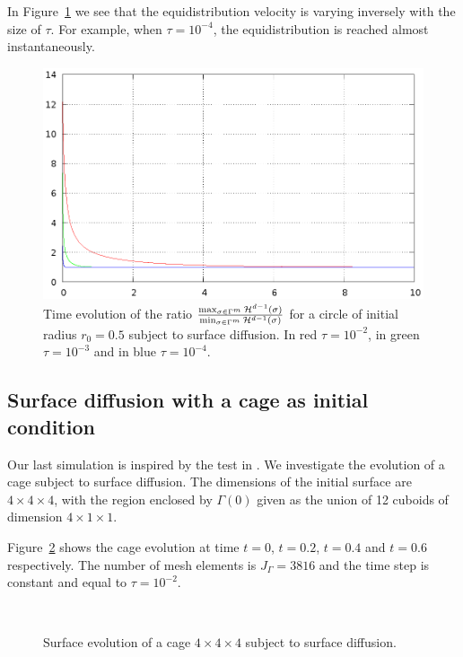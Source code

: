 In Figure~\ref{fig:sd_circle_tau} we see that the equidistribution velocity is
varying inversely with the size of $\tau$. For example, when $\tau=10^{-4}$,
the equidistribution is reached almost instantaneously.

\begin{figure}[htbp]
\centering
\includegraphics[width=.45\textwidth]
{figures/geometric_pdes/sd_circle_tau.ps}
\caption[\sloppy Surface diffusion equidistribution velocity]{Time evolution of
the ratio $\frac{\max_{\sigma\in \Gamma^m}\mathcal{H}^{d-1}(\sigma)}
{\min_{\sigma\in\Gamma^m}\mathcal{H}^{d-1}(\sigma)}$ for a circle of initial radius
${r_0=0.5}$ subject to surface diffusion. In red $\tau=10^{-2}$, in green
$\tau=10^{-3}$ and in blue $\tau=10^{-4}$.}
\label{fig:sd_circle_tau}
\end{figure}

\subsection{Surface diffusion with a cage as initial condition}
\label{subsec:sd_cage}
Our last simulation is inspired by the test in \cite[Fig.~15]{gflows3d}. We
investigate the evolution of a cage subject to surface diffusion. The
dimensions of the initial surface are $4 \times 4 \times 4$, with the region
enclosed by $\Gamma(0)$ given as the union of 12 cuboids of dimension $4 \times
1 \times 1$.

Figure~\ref{fig:sd_cage} shows the cage evolution at time $t=0$, $t=0.2$,
$t=0.4$ and $t=0.6$ respectively. The number of mesh elements is
$J_\Gamma=3816$ and the time step is constant and equal to $\tau=10^{-2}$.

\begin{figure}[htbp]
\centering
{}
\\
\caption[Surface diffusion cage]{Surface evolution of a cage $4 \times 4 \times
4$ subject to surface diffusion.}
\label{fig:sd_cage}
\end{figure}

